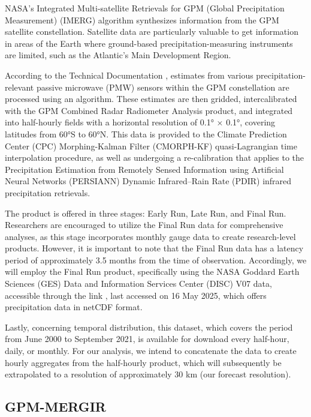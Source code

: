 NASA’s Integrated Multi-satellite Retrievals for GPM (Global Precipitation Measurement) (IMERG) \cite{huffman2019gpm} algorithm synthesizes information from the GPM satellite constellation. Satellite data are particularly valuable to get information in areas of the Earth where ground-based precipitation-measuring instruments are limited, such as the Atlantic’s Main Development Region.

According to the Technical Documentation %
, estimates from various precipitation-relevant passive microwave (PMW) sensors within the GPM constellation are processed using an algorithm. These estimates are then gridded, intercalibrated with the GPM Combined Radar Radiometer Analysis product, and integrated into half-hourly fields with a horizontal resolution of 0.1° × 0.1°, covering latitudes from 60°S to 60°N. This data is provided to the Climate Prediction Center (CPC) Morphing-Kalman Filter (CMORPH-KF) quasi-Lagrangian time interpolation procedure, as well as undergoing a re-calibration that applies to the Precipitation Estimation from Remotely Sensed Information using Artificial Neural Networks (PERSIANN) Dynamic Infrared–Rain Rate (PDIR) infrared precipitation retrievals.

The product is offered in three stages: Early Run, Late Run, and Final Run. Researchers are encouraged to utilize the Final Run data for comprehensive analyses, as this stage incorporates monthly gauge data to create research-level products. However, it is important to note that the Final Run data has a latency period of approximately 3.5 months from the time of observation. Accordingly, we will employ the Final Run product, specifically using the NASA Goddard Earth Sciences (GES) Data and Information Services Center (DISC) V07 data, accessible through the link %
, last accessed on 16 May 2025, which offers precipitation data in netCDF format.

Lastly, concerning temporal distribution, this dataset, which covers the period from June 2000 to September 2021, is available for download every half-hour, daily, or monthly. For our analysis, we intend to concatenate the data to create hourly aggregates from the half-hourly product, which will subsequently be extrapolated to a resolution of approximately 30 km (our forecast resolution).


\subsection{GPM-MERGIR}

